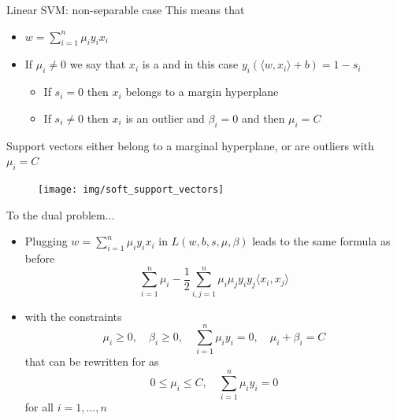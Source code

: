\documentclass[xcolor={usenames,dvipsnames}]{beamer}
\begin{document}
\begin{frame}{Linear SVM: non-separable case}
  This means that
  \begin{itemize}
    \item $w = \sum_{i=1}^n \mu_i y_i x_i$
    \pause
    \item If $\mu_i \neq 0$ we say that $x_i$ is a  and in this case $y_i(\langle {w, x_i} \rangle  + b) = 1 - s_i$
    \begin{itemize}
      \item If $s_i = 0$ then $x_i$ belongs to a margin hyperplane
      \item If $s_i \neq 0$ then $x_i$ is an outlier and $\beta_i = 0$ and then $\mu_i = C$
    \end{itemize}
  \end{itemize}
  \pause 
  \begin{alertblock}{}
  Support vectors either belong to a marginal hyperplane, or are outliers with $\mu_i = C$
  \end{alertblock}
  \pause
  \begin{figure}
 	\begin{center}
 		\texttt{[image: img/soft\_support\_vectors]}
	\end{center} 	 
  \end{figure}
\end{frame}


\begin{frame}{To the dual problem...}
  \begin{itemize}
    \item Plugging $w = \sum_{i=1}^n \mu_i y_i x_i$ in $L(w, b, s, 
    \mu, \beta)$ leads to the same formula as before
    \begin{equation*}
      \sum_{i=1}^n \mu_i - \frac 12 \sum_{i, j=1}^n \mu_i \mu_j y_i 
      y_j \langle {x_i, x_j} \rangle 
    \end{equation*}
    \pause
    \item with the constraints
    \begin{equation*}
      \mu_i \geq 0, \quad \beta_i \geq 0, \quad  
      \sum_{i=1}^n \mu_i y_i  = 0, \quad \mu_i + \beta_i = C
    \end{equation*}
    that can be rewritten for as
    \begin{equation*}
      0 \leq \mu_i \leq C, \quad  
      \sum_{i=1}^n \mu_i y_i  = 0
    \end{equation*}
    for all $i=1, \ldots, n$
  \end{itemize}
  \end{frame}
\end{document}
